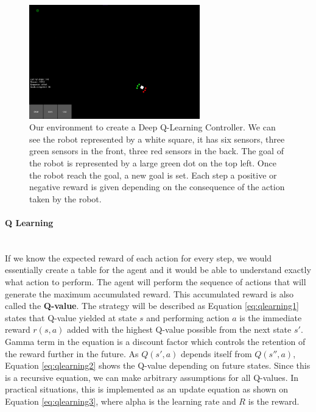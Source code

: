         \begin{figure}[h!]
            \centering
            \includegraphics[width=0.66\textwidth]{images/arena.png}
            \caption{Our environment to create a Deep Q-Learning Controller. We can see the robot represented by a white square, it has six sensors, three green sensors in the front, three red sensors in the back. The goal of the robot is represented by a large green dot on the top left. Once the robot reach the goal, a new goal is set. Each step a positive or negative reward is given depending on the consequence of the action taken by the robot.}
            \label{fig:arena}
        \end{figure}
        
        \paragraph{Q Learning}~\\
        If we know the expected reward of each action for every step, we would essentially create a table for the agent and it would be able to understand exactly what action to perform. The agent will perform the sequence of actions that will generate the maximum accumulated reward. This accumulated reward is also called the \textbf{Q-value}. The strategy will be described as Equation \ref{eq:qlearning1} states that Q-value yielded at state $s$ and performing action $a$ is the immediate reward $r(s,a)$ added with the highest Q-value possible from the next state $s'$. Gamma term in the equation is a discount factor which controls the retention of the reward further in the future. As $Q(s',a)$ depends itself from $Q(s'',a)$, Equation \ref{eq:qlearning2} shows the Q-value depending on future states.
        Since this is a recursive equation, we can make arbitrary assumptions for all Q-values. In practical situations, this is implemented as an update equation as shown on Equation \ref{eq:qlearning3}, where alpha is the learning rate and $R$ is the reward.
        
